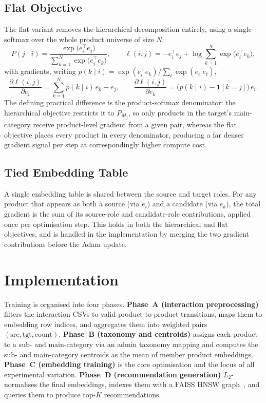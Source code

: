 \subsection{Flat Objective}
The flat variant removes the hierarchical decomposition entirely, using a
single softmax over the whole product universe of size $N$:
\begin{equation}
  \label{eq:emb-flat}
  P(j\mid i) = \frac{\exp\!\big(e_i^\top e_j\big)}
                    {\sum_{k=1}^{N}\exp\!\big(e_i^\top e_k\big)},
  \qquad
  \ell(i,j) = -e_i^\top e_j
    + \log\!\sum_{k=1}^{N}\exp\!\big(e_i^\top e_k\big),
\end{equation}
with gradients, writing $p(k\mid i)=\exp(e_i^\top e_k)/\sum_t\exp(e_i^\top
e_t)$,
\begin{equation}
  \label{eq:emb-flat-grad}
  \frac{\partial\ell(i,j)}{\partial e_i} = \sum_{k=1}^{N} p(k\mid i)\,e_k - e_j,
  \qquad
  \frac{\partial\ell(i,j)}{\partial e_k}
    = \big(p(k\mid i) - \mathbf{1}[k=j]\big)\,e_i.
\end{equation}
The defining practical difference is the product-softmax denominator: the
hierarchical objective restricts it to $P_{M_j}$, so only products in the
target's main-category receive product-level gradient from a given pair,
whereas the flat objective places every product in every denominator, producing
a far denser gradient signal per step at correspondingly higher compute cost.

\subsection{Tied Embedding Table}
A single embedding table is shared between the source and target roles. For any
product that appears as both a source (via $e_i$) and a candidate (via $e_k$),
the total gradient is the sum of its source-role and candidate-role
contributions, applied once per optimisation step. This holds in both the
hierarchical and flat objectives, and is handled in the implementation by
merging the two gradient contributions before the Adam update.

\section{Implementation}
\label{sec:emb-impl}

Training is organised into four phases. \textbf{Phase~A (interaction
preprocessing)} filters the interaction CSVs to valid product-to-product
transitions, maps them to embedding row indices, and aggregates them into
weighted pairs $(\text{src},\text{tgt},\text{count})$. \textbf{Phase~B
(taxonomy and centroids)} assigns each product to a sub- and main-category via
an admin taxonomy mapping and computes the sub- and main-category centroids as
the mean of member product embeddings. \textbf{Phase~C (embedding training)} is
the core optimisation and the locus of all experimental variation.
\textbf{Phase~D (recommendation generation)} $L_2$-normalises the final
embeddings, indexes them with a FAISS HNSW graph~\cite{FAISS,HNSW}, and queries
them to produce top-$K$ recommendations.

